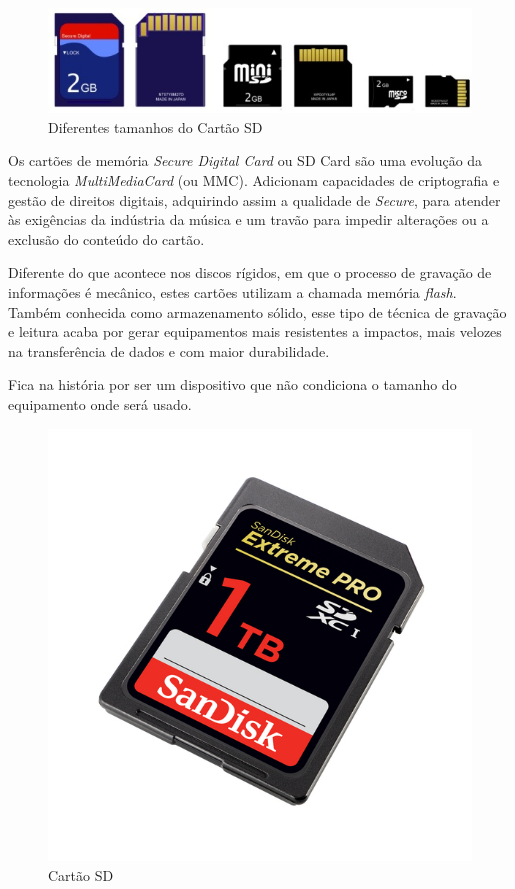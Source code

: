 \documentclass{report}
\begin{document}
	\begin{figure} [h]
		\centering
		\includegraphics[scale=0.6]{sdcardsizes.jpg}
		\caption{Diferentes tamanhos do Cartão SD}
	\end{figure}
	
	Os cartões de memória \textit{Secure Digital Card}  ou SD Card são uma evolução da tecnologia \textit{MultiMediaCard} (ou MMC). Adicionam capacidades de criptografia e gestão de direitos digitais, adquirindo assim a qualidade de \textit{Secure}, para atender às exigências da indústria da música e um travão para impedir alterações ou a exclusão do conteúdo do cartão.
\vspace{1mm}

	Diferente do que acontece nos discos rígidos, em que o processo de gravação de informações é mecânico, estes cartões utilizam a chamada memória \textit{flash}. Também conhecida como armazenamento sólido, esse tipo de técnica de gravação e leitura acaba por gerar equipamentos mais resistentes a impactos, mais velozes na transferência de dados e com maior durabilidade.
\vspace{1mm}

	Fica na história por ser um dispositivo que não condiciona o tamanho do equipamento onde será usado.
\vspace{1mm}

	\begin{figure} [h]
		\centering
		\includegraphics[scale=0.4]{sdcard.jpg}
		\caption{Cartão SD}
	\end{figure}	
\end{document}
